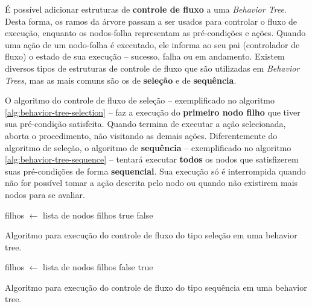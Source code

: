 É possível adicionar estruturas de \textbf{controle de fluxo} a uma
\textit{Behavior Tree}. Desta forma, os ramos da árvore passam a ser usados para
controlar o fluxo de execução, enquanto os nodos-folha representam as
pré-condições e ações\cite[Cap. 10]{Rabin:2015:GAP:2821138}. Quando uma ação de
um nodo-folha é executado, ele informa ao seu pai (controlador de fluxo) o
estado de sua execução -- sucesso, falha ou em andamento. Existem diversos
tipos de estruturas de controle de fluxo que são utilizadas em \textit{Behavior
Trees}, mas as mais comuns são os de \textbf{seleção} e de \textbf{sequência}.

O algoritmo do controle de fluxo de seleção -- exemplificado no algoritmo
\ref{alg:behavior-tree-selection} -- faz a execução do \textbf{primeiro nodo
filho} que tiver sua pré-condição satisfeita. Quando termina de executar a ação
selecionada, aborta o procedimento, não visitando as demais ações.
Diferentemente do algoritmo de seleção, o algoritmo de \textbf{sequência} --
exemplificado no algoritmo \ref{alg:behavior-tree-sequence} -- tentará executar
\textbf{todos} os nodos que satisfizerem suas pré-condições de forma
\textbf{sequencial}. Sua execução só é interrompida quando não for possível
tomar a ação descrita pelo nodo ou quando não existirem mais nodos para se
avaliar.

\begin{algorithm}[H]
\begin{center}
	\begin{algorithmic}[1]
        \STATE filhos $\gets$ lista de nodos filhos
                \RETURN true
            \ENDIF
        \ENDFOR
        \RETURN false
    \end{algorithmic}
\end{center}
\caption[Algoritmo para execução do controle de fluxo do tipo seleção em uma
behavior tree.]
{\label{alg:behavior-tree-selection} Algoritmo para execução do controle de
fluxo do tipo seleção em uma behavior tree.}
\end{algorithm}

\begin{algorithm}[H]
\begin{center}
	\begin{algorithmic}[1]
        \STATE filhos $\gets$ lista de nodos filhos
                \RETURN false
            \ENDIF
        \ENDFOR
        \RETURN true
    \end{algorithmic}
\end{center}
\caption[Algoritmo para execução do controle de fluxo do tipo sequência em uma
behavior tree.]
{\label{alg:behavior-tree-sequence} Algoritmo para execução do controle de fluxo
do tipo sequência em uma behavior tree.}
\end{algorithm}

